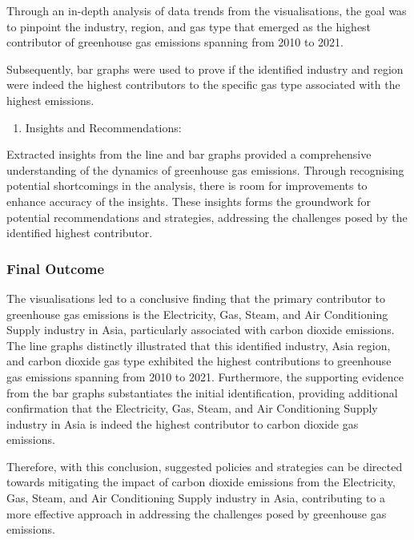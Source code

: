 \documentclass[
]{article}
\providecommand{\tightlist}{%
  \setlength{\itemsep}{0pt}\setlength{\parskip}{0pt}}
\begin{document}
Through an in-depth analysis of data trends from the visualisations, the
goal was to pinpoint the industry, region, and gas type that emerged as
the highest contributor of greenhouse gas emissions spanning from 2010
to 2021.

Subsequently, bar graphs were used to prove if the identified industry
and region were indeed the highest contributors to the specific gas type
associated with the highest emissions.

\begin{enumerate}
\def\labelenumi{\arabic{enumi}.}
\setcounter{enumi}{5}
\tightlist
\item
  Insights and Recommendations:
\end{enumerate}

Extracted insights from the line and bar graphs provided a comprehensive
understanding of the dynamics of greenhouse gas emissions. Through
recognising potential shortcomings in the analysis, there is room for
improvements to enhance accuracy of the insights. These insights forms
the groundwork for potential recommendations and strategies, addressing
the challenges posed by the identified highest contributor.

\hypertarget{final-outcome}{%
\subsubsection{Final Outcome}\label{final-outcome}}

The visualisations led to a conclusive finding that the primary
contributor to greenhouse gas emissions is the Electricity, Gas, Steam,
and Air Conditioning Supply industry in Asia, particularly associated
with carbon dioxide emissions. The line graphs distinctly illustrated
that this identified industry, Asia region, and carbon dioxide gas type
exhibited the highest contributions to greenhouse gas emissions spanning
from 2010 to 2021. Furthermore, the supporting evidence from the bar
graphs substantiates the initial identification, providing additional
confirmation that the Electricity, Gas, Steam, and Air Conditioning
Supply industry in Asia is indeed the highest contributor to carbon
dioxide gas emissions.

Therefore, with this conclusion, suggested policies and strategies can
be directed towards mitigating the impact of carbon dioxide emissions
from the Electricity, Gas, Steam, and Air Conditioning Supply industry
in Asia, contributing to a more effective approach in addressing the
challenges posed by greenhouse gas emissions.
\end{document}
